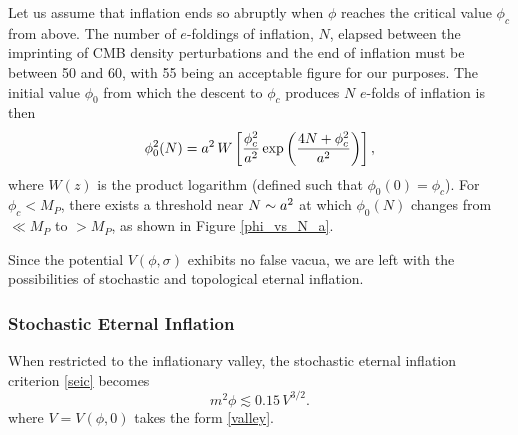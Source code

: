 
Let us assume that inflation ends so abruptly when $\phi$ reaches the critical value $\phi_c$ from above.  The number of $e$-foldings of inflation, $N$, elapsed between the imprinting of CMB density perturbations and the end of inflation must be between 50 and 60, with 55 being an acceptable figure for our purposes.  
The initial value $\phi_0$ from which the descent to $\phi_c$ produces $N$ $e$-folds of inflation is then
\begin{equation} \phi_0^2(N) = a^2 \, W \left[ \frac{\phi_c^2}{a^2} \exp \left(\frac{ 4 N + \phi_c^2 }{a^2} \right) \right], \end{equation}
where $W(z)$ is the product logarithm (defined such that $\phi_0(0) = \phi_c$).  
For $\phi_c < M_P$, there exists a threshold near $N \sim a^2$ at which $\phi_0(N)$ changes from $\ll M_P$ to $> M_P$, as shown in Figure \ref{phi_vs_N_a}.  




Since the potential $V(\phi,\sigma)$ exhibits no false vacua, we are left with the possibilities of stochastic and topological eternal inflation. 

\subsubsection{Stochastic Eternal Inflation}


When restricted to the inflationary valley, the stochastic eternal inflation criterion \eqref{seic} becomes 
\begin{equation} m^2 \phi \lesssim 0.15 \, V^{3/2}. \label{hybrid_seic} \end{equation}
where $V = V(\phi,0)$ takes the form \eqref{valley}.

